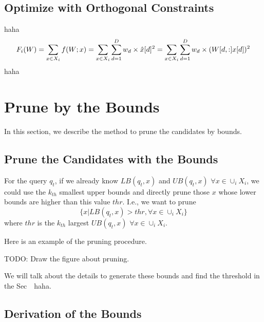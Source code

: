
\subsection{Optimize with Orthogonal Constraints} %
\label{ss:optimize_with_orthogonal_constraints}
haha
\begin{equation}\label{objective-F}
	F_i(W)=\sum_{x \in X_i}{f(W;x)}\\
	=\sum_{x \in X_i}{ \sum^D_{d=1} {w_d\times\hat{x}[d]^2} }\\
	=\sum_{x \in X_i}{ \sum^D_{d=1} {w_d\times(W[d,:]x[d])^2} }
\end{equation}
haha


\section{Prune by the Bounds}
\label{s:prune}
In this section, we describe the method to prune the candidates by bounds.


\subsection{Prune the Candidates with the Bounds} %
\label{ss:prune_the_candidates_with_the_bounds}

For the query $q_t$, if we already know $LB(q_t,x)$ and $UB(q_t,x)$ $\forall x\in \cup_i X_i$, we could use the $k_{th}$ smallest upper bounds and directly prune those $x$ whose lower bounds are higher than this value $thr$. I.e., we want to prune
\[
\{x |LB(q_t,x)>thr, \forall x \in \cup_i X_i\}
\]
where $thr$ is the $k_{th}$ largest $UB(q_t,x)$ $\forall x\in \cup_i X_i$.

Here is an example of the pruning procedure.

TODO: Draw the figure about pruning.

We will talk about the details to generate these bounds and find the threshold in the Sec~~haha.


\subsection{Derivation of the Bounds} %
\label{ss:derivation_of_the_bounds}

